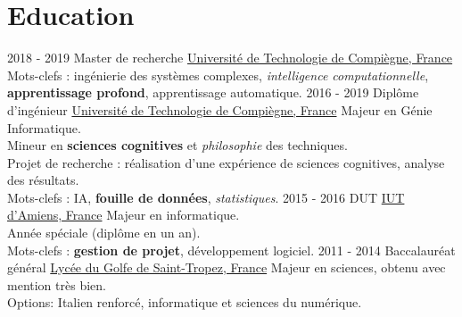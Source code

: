 \documentclass[a4paper]{twentysecondcv} %
\begin{document}
\makeprofile %


\section{Education}

\begin{twenty} %
	\twentyitem
    	{2018 - 2019}
        {}
        {Master de recherche}
        {\href{https://www.utc.fr/}{Université de Technologie de Compiègne, France}}
        {}
        {Mots-clefs : ingénierie des systèmes complexes, \textit{intelligence computationnelle}, \textbf{apprentissage profond}, apprentissage automatique.}
	\twentyitem
    	{2016 - 2019}
        {}
        {Diplôme d'ingénieur}
        {\href{https://www.utc.fr/}{Université de Technologie de Compiègne, France}}
        {}
        {Majeur en Génie Informatique.\\Mineur en \textbf{sciences cognitives} et \textit{philosophie} des techniques.\\Projet de recherche : réalisation d'une expérience de sciences cognitives, analyse des résultats.\\Mots-clefs : IA, \textbf{fouille de données}, \textit{statistiques}.}
	\twentyitem
    	{2015 - 2016}
        {}
        {DUT}
        {\href{http://www.iut-amiens.fr/}{IUT d'Amiens, France}}
        {}
        {Majeur en informatique.\\Année spéciale (diplôme en un an).\\Mots-clefs : \textbf{gestion de projet}, développement logiciel.}
	\twentyitem
    	{2011 - 2014}
		{}
        {Baccalauréat général}
        {\href{http://www.lyc-du-golfe-de-saint-tropez.ac-nice.fr/}{Lycée du Golfe de Saint-Tropez, France}}
        {}
        {Majeur en sciences, obtenu avec mention très bien.\\Options: Italien renforcé, informatique et sciences du numérique.}
\end{twenty}

\end{document}
